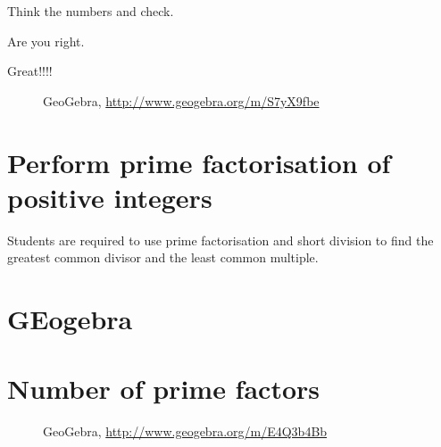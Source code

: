 Think the numbers and check.

Are you right.

Great!!!!

\begin{figure}[H]
\begin{center}
\caption*{GeoGebra, \url{http://www.geogebra.org/m/S7yX9fbe}}
\end{center}
\end{figure}









\section{Perform prime factorisation of positive integers}
Students are required to use prime
factorisation and short division to find the
greatest common divisor and the least
common multiple.
\section{GEogebra}
\section{{Number of prime factors}}
\begin{figure}[H]
\begin{center}
\caption*{GeoGebra, \url{http://www.geogebra.org/m/E4Q3b4Bb}}
\end{center}
\end{figure}

